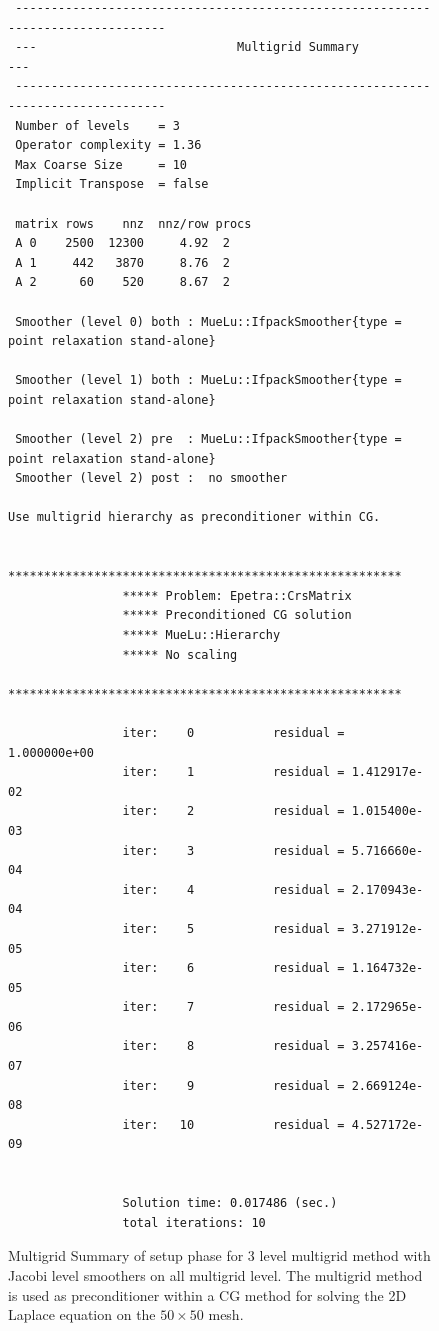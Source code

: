 \documentclass[12pt,a4paper]{article}
\begin{document}
\begin{figure}
\tiny
\begin{minipage}{\textwidth}
\begin{verbatim}
 --------------------------------------------------------------------------------
 ---                            Multigrid Summary                             ---
 --------------------------------------------------------------------------------
 Number of levels    = 3
 Operator complexity = 1.36
 Max Coarse Size     = 10
 Implicit Transpose  = false
 
 matrix rows    nnz  nnz/row procs
 A 0    2500  12300     4.92  2
 A 1     442   3870     8.76  2
 A 2      60    520     8.67  2
 
 Smoother (level 0) both : MueLu::IfpackSmoother{type = point relaxation stand-alone}
 
 Smoother (level 1) both : MueLu::IfpackSmoother{type = point relaxation stand-alone}
 
 Smoother (level 2) pre  : MueLu::IfpackSmoother{type = point relaxation stand-alone}
 Smoother (level 2) post :  no smoother
 
Use multigrid hierarchy as preconditioner within CG.

                *******************************************************
                ***** Problem: Epetra::CrsMatrix
                ***** Preconditioned CG solution
                ***** MueLu::Hierarchy
                ***** No scaling
                *******************************************************

                iter:    0           residual = 1.000000e+00
                iter:    1           residual = 1.412917e-02
                iter:    2           residual = 1.015400e-03
                iter:    3           residual = 5.716660e-04
                iter:    4           residual = 2.170943e-04
                iter:    5           residual = 3.271912e-05
                iter:    6           residual = 1.164732e-05
                iter:    7           residual = 2.172965e-06
                iter:    8           residual = 3.257416e-07
                iter:    9           residual = 2.669124e-08
                iter:   10           residual = 4.527172e-09


                Solution time: 0.017486 (sec.)
                total iterations: 10
\end{verbatim}
\end{minipage}
\caption{Multigrid Summary of setup phase for 3 level multigrid method with Jacobi level smoothers on all multigrid level. The multigrid method is used as preconditioner within a CG method for solving the 2D Laplace equation on the $50\times 50$ mesh.}
\label{fig:jacobisolver}
\end{figure}
\end{document}
